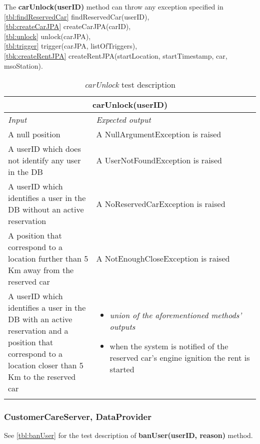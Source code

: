 \clearpage

The \textbf{carUnlock(userID)} method can throw any exception specified in \\\autoref{tbl:findReservedCar} findReservedCar(userID), \\\autoref{tbl:createCarJPA} createCarJPA(carID), \\\autoref{tbl:unlock} unlock(carJPA), \\\autoref{tbl:trigger} trigger(carJPA, listOfTriggers), \\\autoref{tbk:createRentJPA} createRentJPA(startLocation, startTimestamp, car, msoStation).
\begin{longtable}{p{0.35\linewidth}p{0.65\linewidth}}
\multicolumn{2}{c}{\textbf{carUnlock(userID)}} \\
\toprule
\emph{Input} & \emph{Expected output} \\
\midrule
A null position & A NullArgumentException is raised \\
\midrule
A userID which does not identify any user in the DB & A UserNotFoundException is raised\\
\midrule
A userID which identifies a user in the DB without an active reservation & A NoReservedCarException is raised \\
\midrule
A position that correspond to a location further than 5 Km away from the reserved car & A NotEnoughCloseException is raised \\
\midrule
A userID which identifies a user in the DB with an active reservation and a position that correspond to a location closer than 5 Km to the reserved car & \begin{itemize}
	\item \emph{union of the aforementioned methods' \mbox{outputs}}
	\item when the system is notified of the reserved car's engine ignition the rent is started
	\end{itemize}
\\
\bottomrule
\caption{\emph{carUnlock} test description}
\end{longtable}

\subsubsection{CustomerCareServer, DataProvider}
See \autoref{tbl:banUser} for the test description of \textbf{banUser(userID, reason)} method.

